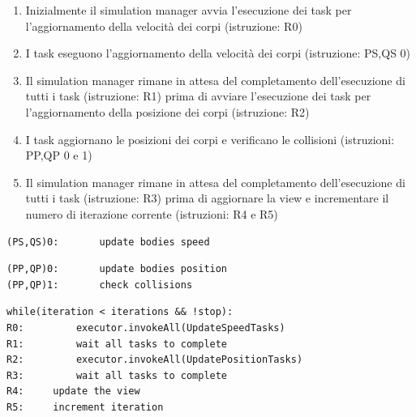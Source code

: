 \documentclass[12pt,a4paper,openright,twoside]{book}
\begin{document}
\begin{enumerate}

    \item Inizialmente il simulation manager avvia l'esecuzione dei task per l'aggiornamento della velocità dei corpi (istruzione: R0)
    \item I task eseguono l'aggiornamento della velocità dei corpi (istruzione: PS,QS 0)
    \item Il simulation manager rimane in attesa del completamento dell'esecuzione di tutti i task (istruzione: R1) prima di avviare l'esecuzione dei task per l'aggiornamento della posizione dei corpi (istruzione: R2)
    \item I task aggiornano le posizioni dei corpi e verificano le collisioni (istruzioni: PP,QP 0 e 1) 
    \item Il simulation manager rimane in attesa del completamento dell'esecuzione di tutti i task (istruzione: R3) prima di aggiornare la view e incrementare il numero di iterazione corrente (istruzioni: R4 e R5)

\newpage

\end{enumerate}

\begin{lstlisting}[label=lst:UpdateSpeedTask,caption=Pseudocodice di UpdateSpeedTask]
(PS,QS)0:		update bodies speed
\end{lstlisting}

\begin{lstlisting}[label=lst:UpdatePositionTask,caption=Pseudocodice di UpdatePositionTask]
(PP,QP)0:		update bodies position
(PP,QP)1:		check collisions
\end{lstlisting}

\begin{lstlisting}[label=lst:simulation_manager,caption=Pseudocodice del simulation manager]
		while(iteration < iterations && !stop):
R0:			executor.invokeAll(UpdateSpeedTasks)
R1:			wait all tasks to complete
R2:			executor.invokeAll(UpdatePositionTasks)
R3:			wait all tasks to complete
R4:     update the view
R5:     increment iteration
\end{lstlisting}
\end{document}
